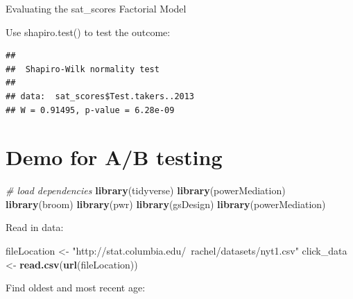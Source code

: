 \documentclass[]{book}
\newenvironment{Shaded}{\begin{snugshade}}{\end{snugshade}}
\newcommand{\CommentTok}[1]{\textcolor[rgb]{0.56,0.35,0.01}{\textit{#1}}}
\newcommand{\DecValTok}[1]{\textcolor[rgb]{0.00,0.00,0.81}{#1}}
\newcommand{\KeywordTok}[1]{\textcolor[rgb]{0.13,0.29,0.53}{\textbf{#1}}}
\newcommand{\NormalTok}[1]{#1}
\newcommand{\OperatorTok}[1]{\textcolor[rgb]{0.81,0.36,0.00}{\textbf{#1}}}
\newcommand{\StringTok}[1]{\textcolor[rgb]{0.31,0.60,0.02}{#1}}
\begin{document}
Evaluating the sat\_scores Factorial Model

Use shapiro.test() to test the outcome:

\begin{Shaded}
\end{Shaded}

\begin{verbatim}
## 
## 	Shapiro-Wilk normality test
## 
## data:  sat_scores$Test.takers..2013
## W = 0.91495, p-value = 6.28e-09
\end{verbatim}

\hypertarget{demo-for-ab-testing}{%
\chapter{Demo for A/B testing}\label{demo-for-ab-testing}}

\begin{Shaded}
\begin{Highlighting}[]
\CommentTok{# load dependencies}
\KeywordTok{library}\NormalTok{(tidyverse)}
\KeywordTok{library}\NormalTok{(powerMediation)}
\KeywordTok{library}\NormalTok{(broom)}
\KeywordTok{library}\NormalTok{(pwr)}
\KeywordTok{library}\NormalTok{(gsDesign)}
\KeywordTok{library}\NormalTok{(powerMediation)}
\end{Highlighting}
\end{Shaded}

Read in data:

\begin{Shaded}
\begin{Highlighting}[]
\NormalTok{fileLocation <-}\StringTok{ "http://stat.columbia.edu/~rachel/datasets/nyt1.csv"}
\NormalTok{click_data <-}\StringTok{ }\KeywordTok{read.csv}\NormalTok{(}\KeywordTok{url}\NormalTok{(fileLocation))}
\end{Highlighting}
\end{Shaded}

Find oldest and most recent age:

\begin{Shaded}
\end{Shaded}
\end{document}
